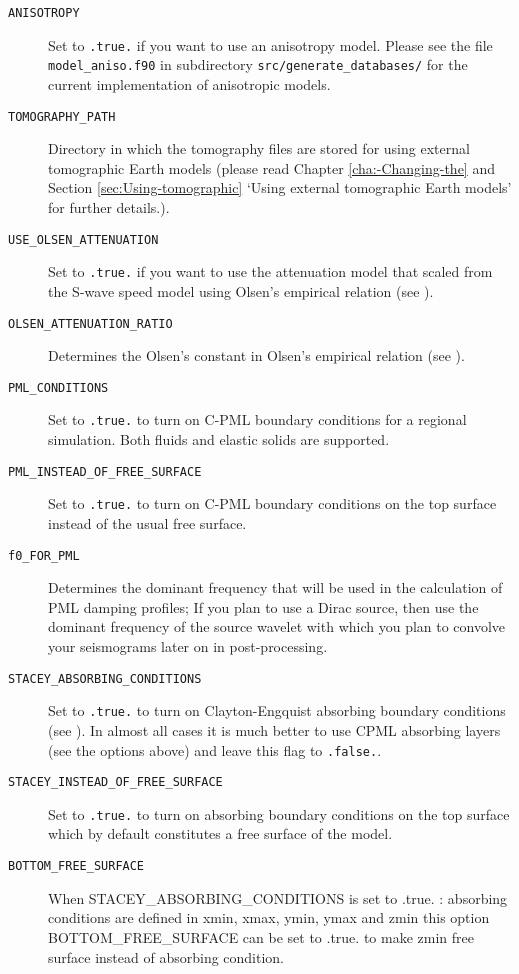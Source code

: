 \begin{description}
\item [{\texttt{ANISOTROPY}}] Set to \texttt{.true.} if you want to use
an anisotropy model. Please see the file \texttt{model\_aniso.f90}
in subdirectory \texttt{src/generate\_databases/} for the current
implementation of anisotropic models.
\item [{\texttt{TOMOGRAPHY\_PATH}}] Directory in which the tomography files
are stored for using external tomographic Earth models (please read
Chapter \ref{cha:-Changing-the} and Section \ref{sec:Using-tomographic}
`Using external tomographic Earth models' for further details.).
\item [{\texttt{USE\_OLSEN\_ATTENUATION}}] Set to \texttt{.true.} if you
want to use the attenuation model that scaled from the S-wave speed
model using Olsen's empirical relation (see \citet{OlDaBr03}).
\item [{\texttt{OLSEN\_ATTENUATION\_RATIO}}] Determines the Olsen's constant
in Olsen's empirical relation (see \citet{OlDaBr03}).
\end{description}

\vspace{1cm}
\begin{description}
\item [{\texttt{PML\_CONDITIONS}}] Set to \texttt{.true.} to turn on C-PML
boundary conditions for a regional simulation. Both fluids and elastic solids are supported.
\item [{\texttt{PML\_INSTEAD\_OF\_FREE\_SURFACE}}] Set to \texttt{.true.}
to turn on C-PML boundary conditions on the top surface instead of
the usual free surface.
\item [{\texttt{f0\_FOR\_PML}}] Determines the dominant frequency that
will be used in the calculation of PML damping profiles;
If you plan to use a Dirac source, then use the dominant frequency of the source wavelet
with which you plan to convolve your seismograms later on in post-processing.
\item [{\texttt{STACEY\_ABSORBING\_CONDITIONS}}] Set to \texttt{.true.}
to turn on Clayton-Engquist absorbing boundary conditions (see \citet{KoTr99}).
In almost all cases it is much better to use CPML absorbing layers
(see the options above) and leave this flag to \texttt{.false.}.
\item [{\texttt{STACEY\_INSTEAD\_OF\_FREE\_SURFACE}}] Set to \texttt{.true.}
to turn on absorbing boundary conditions on the top surface which
by default constitutes a free surface of the model.
\item [{\texttt{BOTTOM\_FREE\_SURFACE}}]
When STACEY\_ABSORBING\_CONDITIONS is set to .true. :
absorbing conditions are defined in xmin, xmax, ymin, ymax and zmin
this option BOTTOM\_FREE\_SURFACE can be set to .true. to
make zmin free surface instead of absorbing condition.
\end{description}

